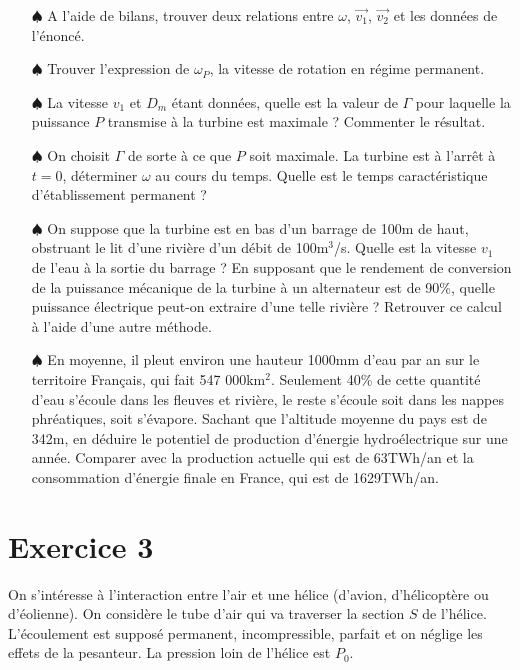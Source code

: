 \documentclass{report}
\begin{document}
\begin{itemize}

	\item[$\spadesuit$] A l'aide de bilans, trouver deux relations entre $\omega$,  $\vec{v_1}$,  $\vec{v_2}$ et les données de l'énoncé.
	
	\item[$\spadesuit$] Trouver l'expression de $\omega_P$, la vitesse de rotation en régime permanent. 
	
	\item[$\spadesuit$] La vitesse $v_1$ et $D_m$ étant données, quelle est la valeur de $\Gamma$ pour laquelle la puissance $P$ transmise à la turbine est maximale ? Commenter le résultat.
	
	\item[$\spadesuit$] On choisit $\Gamma$ de sorte à ce que $P$ soit maximale. La turbine est à l'arrêt à $t=0$, déterminer $\omega$ au cours du temps. Quelle est le temps caractéristique d'établissement permanent ?
	
	\item[$\spadesuit$] On suppose que la turbine est en bas d'un barrage de 100m de haut, obstruant le lit d'une rivière d'un débit de 100m$^3$/s. Quelle est la vitesse $v_1$ de l'eau à la sortie du barrage ? En supposant que le rendement de conversion de la puissance mécanique de la turbine à un alternateur est de 90\%, quelle puissance électrique peut-on extraire d'une telle rivière ? Retrouver ce calcul à l'aide d'une autre méthode.
	
	\item[$\spadesuit$] En moyenne, il pleut environ une hauteur 1000mm d'eau par an sur le territoire Français, qui fait 547 000km$^2$. Seulement 40\% de cette quantité d'eau s'écoule dans les fleuves et rivière, le reste s'écoule soit dans les nappes phréatiques, soit s'évapore. Sachant que l'altitude moyenne du pays est de 342m, en déduire le potentiel de production d'énergie hydroélectrique sur une année. Comparer avec la production actuelle qui est de 63TWh/an et la consommation d'énergie finale en France, qui est de 1629TWh/an.

\end{itemize}

\newpage

\section*{Exercice 3}

On s'intéresse à l'interaction entre l'air et une hélice (d'avion, d'hélicoptère ou d'éolienne). On considère le tube d'air qui va traverser la section $S$ de l'hélice. L'écoulement est supposé permanent, incompressible, parfait et on néglige les effets de la pesanteur. La pression loin de l'hélice est $P_0$. 
\end{document}

